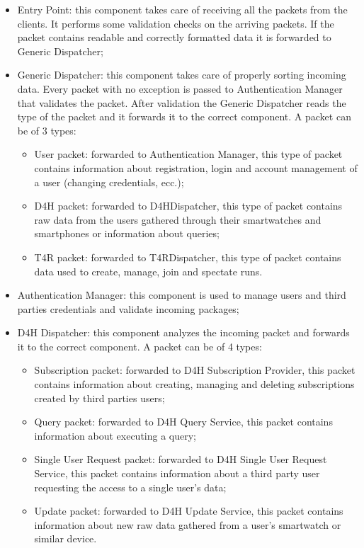 \begin{itemize}
\item Entry Point: this component takes care of receiving all the packets from the clients. It performs some validation checks on the arriving packets. If the packet contains readable and correctly formatted data it is forwarded to Generic Dispatcher;
\item Generic Dispatcher: this component takes care of properly sorting incoming data. Every packet with no exception is passed to Authentication Manager that validates the packet. After validation the Generic Dispatcher reads the type of the packet and it forwards it to the correct component. A packet can be of 3 types:
\begin{itemize}
\item User packet: forwarded to Authentication Manager, this type of packet contains information about registration, login and account management of a user (changing credentials, ecc.);
\item D4H packet: forwarded to D4HDispatcher, this type of packet contains raw data from the users gathered through their smartwatches and smartphones or information about queries;
\item T4R packet: forwarded to T4RDispatcher, this type of packet contains data used to create, manage, join and spectate runs.
\end{itemize}
\item Authentication Manager: this component is used to manage users and third parties credentials and validate incoming packages;
\item D4H Dispatcher: this component analyzes the incoming packet and forwards it to the correct component. A packet can be of 4 types:
\begin{itemize}
\item Subscription packet: forwarded to D4H Subscription Provider, this packet contains information about creating, managing and deleting subscriptions created by third parties users;
\item Query packet: forwarded to D4H Query Service, this packet contains information about executing a query;
\item Single User Request packet: forwarded to D4H Single User Request Service, this packet contains information about a third party user requesting the access to a single user's data;
\item Update packet: forwarded to D4H Update Service, this packet contains information about new raw data gathered from a user's smartwatch or similar device.

\end{itemize}
\end{itemize}
